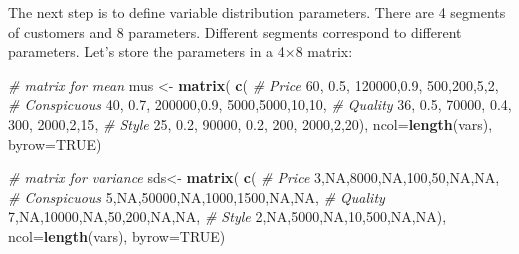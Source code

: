 \documentclass[12pt,]{krantz}
\makeatletter
\newenvironment{Shaded}{\begin{snugshade}}{\end{snugshade}}
\newcommand{\CommentTok}[1]{\textcolor[rgb]{0.37,0.37,0.37}{\textit{#1}}}
\newcommand{\DataTypeTok}[1]{\textcolor[rgb]{0.27,0.27,0.27}{#1}}
\newcommand{\DecValTok}[1]{\textcolor[rgb]{0.06,0.06,0.06}{#1}}
\newcommand{\FloatTok}[1]{\textcolor[rgb]{0.06,0.06,0.06}{#1}}
\newcommand{\KeywordTok}[1]{\textcolor[rgb]{0.27,0.27,0.27}{\textbf{#1}}}
\newcommand{\NormalTok}[1]{#1}
\newcommand{\OtherTok}[1]{\textcolor[rgb]{0.37,0.37,0.37}{#1}}
\newcommand{\StringTok}[1]{\textcolor[rgb]{0.5,0.5,0.5}{#1}}
\newenvironment{kframe}{%
\medskip{}
\setlength{\fboxsep}{.8em}
 \def\at@end@of@kframe{}%
 \ifinner\ifhmode%
  \def\at@end@of@kframe{\end{minipage}}%
  \begin{minipage}{\columnwidth}%
 \fi\fi%
 \def\FrameCommand##1{\hskip\@totalleftmargin \hskip-\fboxsep
 \colorbox{shadecolor}{##1}\hskip-\fboxsep
     \hskip-\linewidth \hskip-\@totalleftmargin \hskip\columnwidth}%
 \MakeFramed {\advance\hsize-\width
   \@totalleftmargin\z@ \linewidth\hsize
   \@setminipage}}%
 {\par\unskip\endMakeFramed%
 \at@end@of@kframe}
\renewenvironment{Shaded}{\begin{kframe}}{\end{kframe}}
\makeatother
\begin{document}
The next step is to define variable distribution parameters. There are 4 segments of customers and 8 parameters. Different segments correspond to different parameters. Let's store the parameters in a 4×8 matrix:

\begin{Shaded}
\begin{Highlighting}[]
\CommentTok{# matrix for mean}
\NormalTok{mus <-}\StringTok{ }\KeywordTok{matrix}\NormalTok{( }\KeywordTok{c}\NormalTok{(}
  \CommentTok{# Price}
  \DecValTok{60}\NormalTok{, }\FloatTok{0.5}\NormalTok{, }\DecValTok{120000}\NormalTok{,}\FloatTok{0.9}\NormalTok{, }\DecValTok{500}\NormalTok{,}\DecValTok{200}\NormalTok{,}\DecValTok{5}\NormalTok{,}\DecValTok{2}\NormalTok{,}
  \CommentTok{# Conspicuous}
  \DecValTok{40}\NormalTok{, }\FloatTok{0.7}\NormalTok{, }\DecValTok{200000}\NormalTok{,}\FloatTok{0.9}\NormalTok{, }\DecValTok{5000}\NormalTok{,}\DecValTok{5000}\NormalTok{,}\DecValTok{10}\NormalTok{,}\DecValTok{10}\NormalTok{,}
  \CommentTok{# Quality}
  \DecValTok{36}\NormalTok{, }\FloatTok{0.5}\NormalTok{, }\DecValTok{70000}\NormalTok{, }\FloatTok{0.4}\NormalTok{, }\DecValTok{300}\NormalTok{, }\DecValTok{2000}\NormalTok{,}\DecValTok{2}\NormalTok{,}\DecValTok{15}\NormalTok{,}
  \CommentTok{# Style}
  \DecValTok{25}\NormalTok{, }\FloatTok{0.2}\NormalTok{, }\DecValTok{90000}\NormalTok{, }\FloatTok{0.2}\NormalTok{, }\DecValTok{200}\NormalTok{, }\DecValTok{2000}\NormalTok{,}\DecValTok{2}\NormalTok{,}\DecValTok{20}\NormalTok{), }
  \DataTypeTok{ncol=}\KeywordTok{length}\NormalTok{(vars), }\DataTypeTok{byrow=}\OtherTok{TRUE}\NormalTok{)}
\end{Highlighting}
\end{Shaded}

\begin{Shaded}
\begin{Highlighting}[]
\CommentTok{# matrix for variance}
\NormalTok{sds<-}\StringTok{ }\KeywordTok{matrix}\NormalTok{( }\KeywordTok{c}\NormalTok{(}
  \CommentTok{# Price}
  \DecValTok{3}\NormalTok{,}\OtherTok{NA}\NormalTok{,}\DecValTok{8000}\NormalTok{,}\OtherTok{NA}\NormalTok{,}\DecValTok{100}\NormalTok{,}\DecValTok{50}\NormalTok{,}\OtherTok{NA}\NormalTok{,}\OtherTok{NA}\NormalTok{,}
  \CommentTok{# Conspicuous}
  \DecValTok{5}\NormalTok{,}\OtherTok{NA}\NormalTok{,}\DecValTok{50000}\NormalTok{,}\OtherTok{NA}\NormalTok{,}\DecValTok{1000}\NormalTok{,}\DecValTok{1500}\NormalTok{,}\OtherTok{NA}\NormalTok{,}\OtherTok{NA}\NormalTok{,}
  \CommentTok{# Quality}
  \DecValTok{7}\NormalTok{,}\OtherTok{NA}\NormalTok{,}\DecValTok{10000}\NormalTok{,}\OtherTok{NA}\NormalTok{,}\DecValTok{50}\NormalTok{,}\DecValTok{200}\NormalTok{,}\OtherTok{NA}\NormalTok{,}\OtherTok{NA}\NormalTok{,}
  \CommentTok{# Style}
  \DecValTok{2}\NormalTok{,}\OtherTok{NA}\NormalTok{,}\DecValTok{5000}\NormalTok{,}\OtherTok{NA}\NormalTok{,}\DecValTok{10}\NormalTok{,}\DecValTok{500}\NormalTok{,}\OtherTok{NA}\NormalTok{,}\OtherTok{NA}\NormalTok{), }
  \DataTypeTok{ncol=}\KeywordTok{length}\NormalTok{(vars), }\DataTypeTok{byrow=}\OtherTok{TRUE}\NormalTok{)}
\end{Highlighting}
\end{Shaded}
\end{document}
